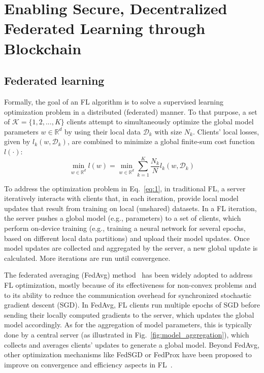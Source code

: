 \documentclass[lettersize,journal]{IEEEtran}
\begin{document}
\section{Enabling Secure, Decentralized Federated Learning through Blockchain}
\label{section:bc_fl}

\subsection{Federated learning}
\label{section:federated_learning}

Formally, the goal of an FL algorithm is to solve a supervised learning optimization problem in a distributed (federated) manner. To that purpose, a set of $\mathcal{K}=\{1,2,...,K\}$ clients attempt to simultaneously optimize the global model parameters $w\in \mathbb{R}^d$ by using their local data $\mathcal{D}_k$ with size $N_k$. Clients' local losses, given by $l_k(w,\mathcal{D}_k)$, are combined to minimize a global finite-sum cost function $l(\cdot)$:
\begin{equation}
\min_{w\in \mathbb{R}^d} l(w) = \min_{w\in \mathbb{R}^d} \sum_{k=1}^{K} \frac{N_k}{N} l_k(w,\mathcal{D}_k)
\label{eq:1}
\end{equation}

To address the optimization problem in Eq.~\eqref{eq:1}, in traditional FL, a server iteratively interacts with clients that, in each iteration, provide local model updates that result from training on local (unshared) datasets. In a FL iteration, the server pushes a global model (e.g., parameters) to a set of clients, which perform on-device training (e.g., training a neural network for several epochs, based on different local data partitions) and upload their model updates. Once model updates are collected and aggregated by the server, a new global update is calculated. More iterations are run until convergence.

The federated averaging (FedAvg) method~\cite{mcmahan2017communication} has been widely adopted to address FL optimization, mostly because of its effectiveness for non-convex problems and to its ability to reduce the communication overhead for synchronized stochastic gradient descent (SGD). In FedAvg, FL clients run multiple epochs of SGD before sending their locally computed gradients to the server, which updates the global model accordingly. As for the aggregation of model parameters, this is typically done by a central server (as illustrated in Fig.~\ref{fig:model_aggregation}), which collects and averages clients' updates to generate a global model. Beyond FedAvg, other optimization mechanisms like FedSGD or FedProx have been proposed to improve on convergence and efficiency aspects in FL~\cite{reddi2020adaptive}.
\end{document}
